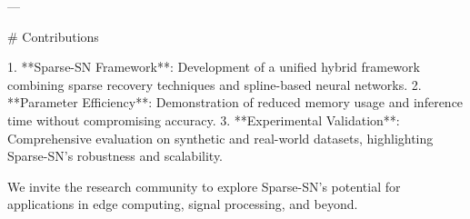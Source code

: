 ---

# Contributions  

1. **Sparse-SN Framework**: Development of a unified hybrid framework combining sparse recovery techniques and spline-based neural networks.
2. **Parameter Efficiency**: Demonstration of reduced memory usage and inference time without compromising accuracy.
3. **Experimental Validation**: Comprehensive evaluation on synthetic and real-world datasets, highlighting Sparse-SN's robustness and scalability.

We invite the research community to explore Sparse-SN's potential for applications in edge computing, signal processing, and beyond.